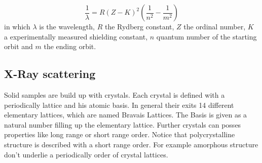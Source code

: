 	\begin{equation}
		\frac{1}{\lambda}=R(Z-K)^2 \left ( \frac{1}{n^2} - \frac{1}{m^2} \right )
	\end{equation}
	in which $\lambda$ is the wavelength, $R$ the Rydberg constant, $Z$ the ordinal number, $K$ a experimentally measured shielding constant, $n$ quantum number of the starting orbit and $m$ the ending orbit.
	
	\subsection{X-Ray scattering}
	Solid samples are build up with crystals. Each crystal is defined with a periodically lattice and his atomic basis. In general their exits 14 different elementary lattices, which are named Bravais Lattices. The Basis is given as a natural number filling up the elementary lattice. Further crystals can posses properties like long range or short range order. Notice that polycrystalline structure is described with a short range order. For example amorphous structure don't underlie a periodically order of crystal lattices.
	
